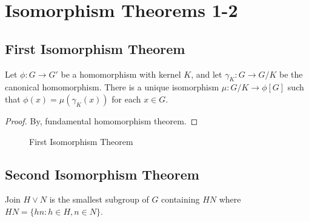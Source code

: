 \section{Isomorphism Theorems 1-2}
\subsection{First Isomorphism Theorem}
\begin{theorem}
	Let $\phi : G \to G'$ be a homomorphism with kernel $K$, and let $\gamma_K : G \to G/K$ be the canonical homomorphism.
	There is a unique isomorphism $\mu : G/K \to \phi[G]$ such that $\phi(x) = \mu(\gamma_K(x))$ for each $x \in G$.
\end{theorem}
\begin{proof}
	By, fundamental homomorphism theorem.\cite[\S14.1]{fraleigh}
\end{proof}
\begin{figure}[h]
	\centering
	\caption{First Isomorphism Theorem}
\end{figure}

\subsection{Second Isomorphism Theorem}
\begin{definition}

	Join $H \vee N$ is the smallest subgroup of $G$ containing $HN$ where $HN = \{ hn : h \in H, n \in N\}$.
\end{definition}

